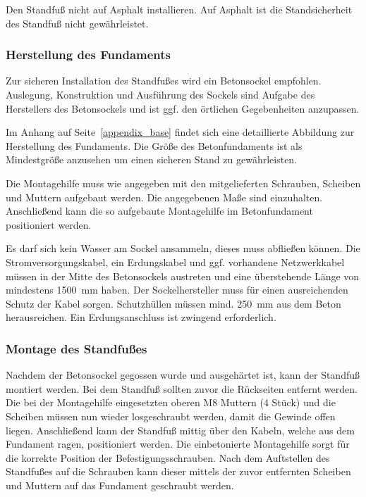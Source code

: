 \documentclass[a4paper,10pt]{article}
\newcommand{\hint}[1]{\begin{tcolorbox}[colback=boxgray,colframe=black,coltext=
white,title=Hinweis]#1\end{tcolorbox}}
\begin{document}
\begin{multicols*}{2}
    \hint{Den Standfuß nicht auf Asphalt installieren. Auf Asphalt ist die
	Standsicherheit des Standfuß nicht gewährleistet.}


	\subsubsection{Herstellung des Fundaments}
    Zur sicheren Installation des Standfußes wird ein Betonsockel empfohlen.
	Auslegung, Konstruktion und Ausführung des Sockels sind Aufgabe des
	Herstellers des Betonsockels und ist ggf. den örtlichen Gegebenheiten
	anzupassen.
	\par
	Im Anhang auf Seite~\ref{appendix_base} findet sich eine detaillierte
	Abbildung zur Herstellung des Fundaments. Die Größe des Betonfundaments ist als
	Mindestgröße anzusehen um einen sicheren Stand zu gewährleisten.
	\par
	Die Montagehilfe muss wie angegeben mit den mitgelieferten Schrauben,
	Scheiben und Muttern aufgebaut werden. Die angegebenen Maße sind
	einzuhalten. Anschließend kann die so aufgebaute Montagehilfe im
	Betonfundament positioniert werden.
	\par
	Es darf sich kein Wasser am Sockel ansammeln, dieses muss abfließen können. Die 
	Stromversorgungskabel, ein Erdungskabel und ggf. vorhandene Netzwerkkabel müssen in der Mitte 
	des Betonsockels austreten und eine überstehende Länge von mindestens
	\SI{1500}{\milli\meter} haben. Der Sockelhersteller muss
	für einen ausreichenden Schutz der Kabel sorgen. Schutzhüllen müssen mind.
	\SI{250}{\milli\meter} aus dem Beton herausreichen. Ein Erdungsanschluss ist
	zwingend erforderlich.

	\subsubsection{Montage des Standfußes}
	Nachdem der Betonsockel gegossen wurde und ausgehärtet ist, kann
	der Standfuß montiert werden. Bei dem Standfuß sollten zuvor die Rückseiten 
	entfernt werden. Die bei der Montagehilfe
	eingesetzten oberen M8 Muttern (4 Stück) und die Scheiben müssen nun wieder losgeschraubt werden,
	damit die Gewinde offen liegen. Anschließend kann der Standfuß mittig über den
	Kabeln, welche aus dem Fundament ragen, positioniert werden. Die
	einbetonierte Montagehilfe sorgt für die korrekte Position der
	Befestigungsschrauben. Nach dem Auftstellen des Standfußes auf die Schrauben kann dieser
	mittels der zuvor entfernten Scheiben und Muttern auf das Fundament
	geschraubt werden.


\end{multicols*}
\end{document}
